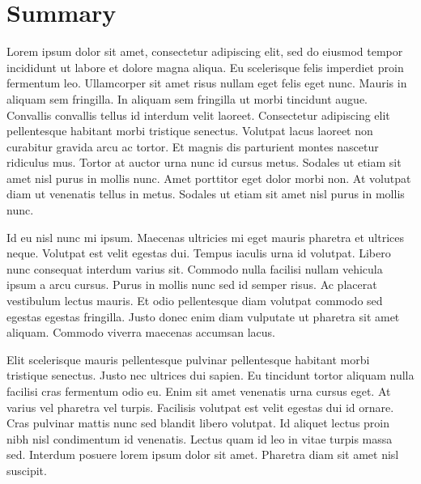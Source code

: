 \documentclass[paper = a4, fontsize = 12pt, numbers = noenddot, DIV = 15, twoside, 
paper = portrait,
listof = totoc,
listof = chapterentry,
egregdoesnotlikesansseriftitles, %
parskip = half %
]{scrbook}
\begin{document}
\clearpage

\glsaddall %

\chapter*{Summary}

Lorem ipsum dolor sit amet, consectetur adipiscing elit, sed do eiusmod tempor incididunt ut labore et dolore magna aliqua. Eu scelerisque felis imperdiet proin fermentum leo. Ullamcorper sit amet risus nullam eget felis eget nunc. Mauris in aliquam sem fringilla. In aliquam sem fringilla ut morbi tincidunt augue. Convallis convallis tellus id interdum velit laoreet. Consectetur adipiscing elit pellentesque habitant morbi tristique senectus. Volutpat lacus laoreet non curabitur gravida arcu ac tortor. Et magnis dis parturient montes nascetur ridiculus mus. Tortor at auctor urna nunc id cursus metus. Sodales ut etiam sit amet nisl purus in mollis nunc. Amet porttitor eget dolor morbi non. At volutpat diam ut venenatis tellus in metus. Sodales ut etiam sit amet nisl purus in mollis nunc.

Id eu nisl nunc mi ipsum. Maecenas ultricies mi eget mauris pharetra et ultrices neque. Volutpat est velit egestas dui. Tempus iaculis urna id volutpat. Libero nunc consequat interdum varius sit. Commodo nulla facilisi nullam vehicula ipsum a arcu cursus. Purus in mollis nunc sed id semper risus. Ac placerat vestibulum lectus mauris. Et odio pellentesque diam volutpat commodo sed egestas egestas fringilla. Justo donec enim diam vulputate ut pharetra sit amet aliquam. Commodo viverra maecenas accumsan lacus.

Elit scelerisque mauris pellentesque pulvinar pellentesque habitant morbi tristique senectus. Justo nec ultrices dui sapien. Eu tincidunt tortor aliquam nulla facilisi cras fermentum odio eu. Enim sit amet venenatis urna cursus eget. At varius vel pharetra vel turpis. Facilisis volutpat est velit egestas dui id ornare. Cras pulvinar mattis nunc sed blandit libero volutpat. Id aliquet lectus proin nibh nisl condimentum id venenatis. Lectus quam id leo in vitae turpis massa sed. Interdum posuere lorem ipsum dolor sit amet. Pharetra diam sit amet nisl suscipit.

\clearpage

\tableofcontents
\end{document}
